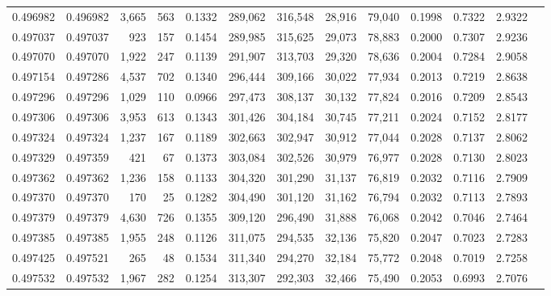 \begin{tabular}{rrrrrrrrrrrrr}
0.496982 & 0.496982 & 3,665 &   563 &                                     0.1332 & 289,062 & 316,548 &  28,916 &  79,040 & 0.1998 & 0.7322 & 2.9322 \\
0.497037 & 0.497037 &   923 &   157 &                                     0.1454 & 289,985 & 315,625 &  29,073 &  78,883 & 0.2000 & 0.7307 & 2.9236 \\
0.497070 & 0.497070 & 1,922 &   247 &                                     0.1139 & 291,907 & 313,703 &  29,320 &  78,636 & 0.2004 & 0.7284 & 2.9058 \\
0.497154 & 0.497286 & 4,537 &   702 &                                     0.1340 & 296,444 & 309,166 &  30,022 &  77,934 & 0.2013 & 0.7219 & 2.8638 \\
0.497296 & 0.497296 & 1,029 &   110 &                                     0.0966 & 297,473 & 308,137 &  30,132 &  77,824 & 0.2016 & 0.7209 & 2.8543 \\
0.497306 & 0.497306 & 3,953 &   613 &                                     0.1343 & 301,426 & 304,184 &  30,745 &  77,211 & 0.2024 & 0.7152 & 2.8177 \\
0.497324 & 0.497324 & 1,237 &   167 &                                     0.1189 & 302,663 & 302,947 &  30,912 &  77,044 & 0.2028 & 0.7137 & 2.8062 \\
0.497329 & 0.497359 &   421 &    67 &                                     0.1373 & 303,084 & 302,526 &  30,979 &  76,977 & 0.2028 & 0.7130 & 2.8023 \\
0.497362 & 0.497362 & 1,236 &   158 &                                     0.1133 & 304,320 & 301,290 &  31,137 &  76,819 & 0.2032 & 0.7116 & 2.7909 \\
0.497370 & 0.497370 &   170 &    25 &                                     0.1282 & 304,490 & 301,120 &  31,162 &  76,794 & 0.2032 & 0.7113 & 2.7893 \\
0.497379 & 0.497379 & 4,630 &   726 &                                     0.1355 & 309,120 & 296,490 &  31,888 &  76,068 & 0.2042 & 0.7046 & 2.7464 \\
0.497385 & 0.497385 & 1,955 &   248 &                                     0.1126 & 311,075 & 294,535 &  32,136 &  75,820 & 0.2047 & 0.7023 & 2.7283 \\
0.497425 & 0.497521 &   265 &    48 &                                     0.1534 & 311,340 & 294,270 &  32,184 &  75,772 & 0.2048 & 0.7019 & 2.7258 \\
0.497532 & 0.497532 & 1,967 &   282 &                                     0.1254 & 313,307 & 292,303 &  32,466 &  75,490 & 0.2053 & 0.6993 & 2.7076 \\

\end{tabular}
